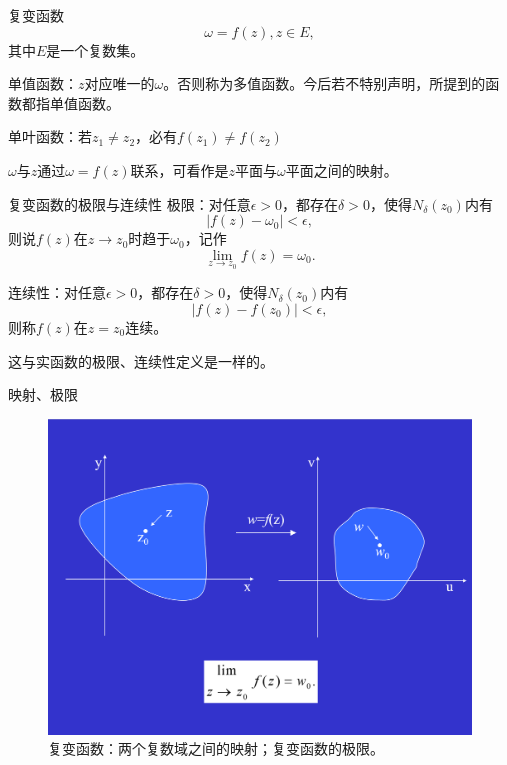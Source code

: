 \documentclass[11pt]{beamer}
\newcommand{\kong}[1][0.5]{\vspace{#1cm}}
\begin{document}
\begin{frame}{复变函数}
\begin{equation}
\omega = f(z),z \in E,
\end{equation}
其中$E$是一个复数集。

\kong[0.5]
单值函数：$z$对应唯一的$\omega$。否则称为多值函数。今后若不特别声明，所提到的函数都指单值函数。

\kong[0.5]
单叶函数：若$z_1 \neq z_2$，必有$f(z_1) \neq f(z_2)$

\kong[0.5]
$\omega$与$z$通过$\omega = f(z)$联系，可看作是$z$平面与$\omega$平面之间的映射。
\end{frame}

\begin{frame}{复变函数的极限与连续性}
极限：对任意$\epsilon>0$，都存在$\delta>0$，使得$N_\delta(z_0)$内有
\begin{equation}
|f(z) - \omega_0 | < \epsilon,
\end{equation}
则说$f(z)$在$z\rightarrow z_0$时趋于$\omega_0$，记作
\begin{equation}
\lim\limits_{z \rightarrow z_0} f(z) = \omega_0.
\end{equation}

\kong[0.5]
连续性：对任意$\epsilon>0$，都存在$\delta>0$，使得$N_\delta(z_0)$内有
\begin{equation}
|f(z) - f(z_0)| < \epsilon,
\end{equation}
则称$f(z)$在$z=z_0$连续。

\kong[0.5]
这与实函数的极限、连续性定义是一样的。
\end{frame}

\begin{frame}{映射、极限}
\begin{figure}
	\centering
	\includegraphics[width=0.7\linewidth]{chap1_07}
	\caption{复变函数：两个复数域之间的映射；复变函数的极限。}
	\label{fig:chap107}
\end{figure}

\end{frame}
\end{document}
